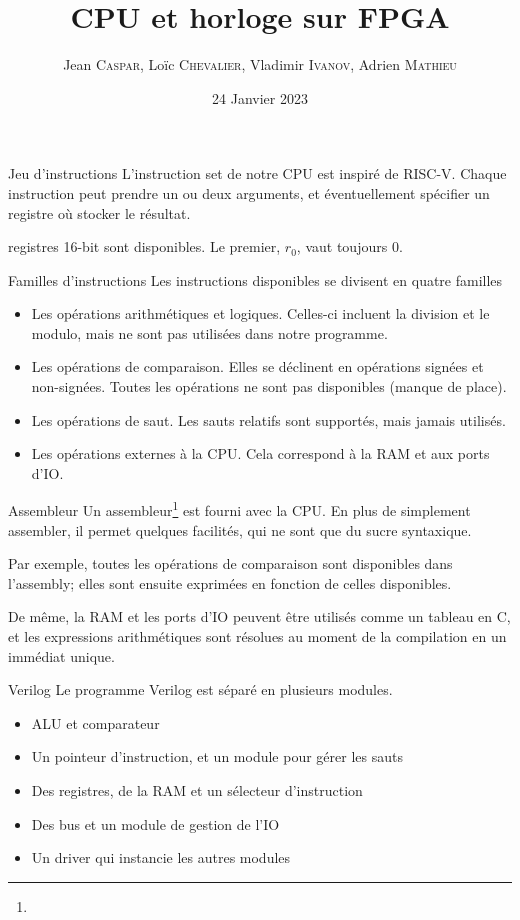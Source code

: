 \documentclass{beamer}
\title{CPU et horloge sur FPGA}
\author[%
J. \textsc{Caspar},
L. \textsc{Chevalier},
V. \textsc{Ivanov},
A. \textsc{Mathieu}%
]{
  Jean \textsc{Caspar},
  Loïc \textsc{Chevalier},
  Vladimir \textsc{Ivanov},
  Adrien \textsc{Mathieu}
}
\date{24 Janvier 2023}
\begin{document}
\begin{frame}[noframenumbering]
  \titlepage
\end{frame}

\begin{frame}[fragile]{Jeu d'instructions}
  L'instruction set de notre CPU est inspiré de RISC-V. Chaque
  instruction peut prendre un ou deux arguments, et éventuellement
  spécifier un registre où stocker le résultat.\par
   registres 16-bit sont disponibles. Le premier, \(r_0\), vaut
  toujours \(0\).\par
  \pause
\end{frame}

\begin{frame}[fragile]{Familles d'instructions}
  Les instructions disponibles se divisent en quatre familles\pause
  \begin{itemize}
  \item Les opérations arithmétiques et logiques. Celles-ci incluent
    la division et le modulo, mais ne sont pas utilisées dans notre
    programme.
    \pause
  \item Les opérations de comparaison. Elles se déclinent en opérations
    signées et non-signées. Toutes les opérations ne sont pas
    disponibles (manque de place).
    \pause
  \item Les opérations de saut. Les sauts relatifs sont supportés, mais
    jamais utilisés.
    \pause
  \item Les opérations externes à la CPU. Cela correspond à la RAM et
    aux ports d'IO.
  \end{itemize}
\end{frame}

\begin{frame}{Assembleur}
  Un assembleur\footnote{} est fourni avec la CPU. En plus
  de simplement assembler, il permet quelques facilités, qui ne sont
  que du sucre syntaxique.\par
  \pause
  Par exemple, toutes les opérations de comparaison sont disponibles
  dans l'assembly; elles sont ensuite exprimées en fonction de celles
  disponibles.\par
  \pause
  De même, la RAM et les ports d'IO peuvent être utilisés comme un
  tableau en C, et les expressions arithmétiques sont résolues au
  moment de la compilation en un immédiat unique.
\end{frame}

\begin{frame}{Verilog}
    Le programme Verilog est séparé en plusieurs modules.
    \begin{itemize}
        \item ALU et comparateur
        \item Un pointeur d'instruction, et un module pour gérer les sauts
        \item Des registres, de la RAM et un sélecteur d'instruction
        \item Des bus et un module de gestion de l'IO
        \item Un driver qui instancie les autres modules
    \end{itemize}
\end{frame}
\end{document}
